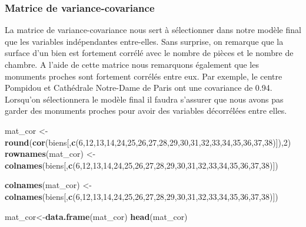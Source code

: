 \documentclass[french,]{article}
\newenvironment{Shaded}{\begin{snugshade}}{\end{snugshade}}
\newcommand{\DecValTok}[1]{\textcolor[rgb]{0.00,0.00,0.81}{#1}}
\newcommand{\KeywordTok}[1]{\textcolor[rgb]{0.13,0.29,0.53}{\textbf{#1}}}
\newcommand{\NormalTok}[1]{#1}
\newcommand{\StringTok}[1]{\textcolor[rgb]{0.31,0.60,0.02}{#1}}
\begin{document}
\hypertarget{matrice-de-variance-covariance}{%
\subsubsection{Matrice de
variance-covariance}\label{matrice-de-variance-covariance}}

La matrice de variance-covariance nous sert à sélectionner dans notre
modèle final que les variables indépendantes entre-elles. Sans surprise,
on remarque que la surface d'un bien est fortement corrélé avec le
nombre de pièces et le nombre de chambre. A l'aide de cette matrice nous
remarquons également que les monuments proches sont fortement corrélés
entre eux. Par exemple, le centre Pompidou et Cathédrale Notre-Dame de
Paris ont une covariance de 0.94. Lorsqu'on sélectionnera le modèle
final il faudra s'assurer que nous avons pas garder des monuments
proches pour avoir des variables décorrélées entre elles.

\begin{Shaded}
\begin{Highlighting}[]
\NormalTok{mat_cor <-}\StringTok{ }\KeywordTok{round}\NormalTok{(}\KeywordTok{cor}\NormalTok{(biens[,}\KeywordTok{c}\NormalTok{(}\DecValTok{6}\NormalTok{,}\DecValTok{12}\NormalTok{,}\DecValTok{13}\NormalTok{,}\DecValTok{14}\NormalTok{,}\DecValTok{24}\NormalTok{,}\DecValTok{25}\NormalTok{,}\DecValTok{26}\NormalTok{,}\DecValTok{27}\NormalTok{,}\DecValTok{28}\NormalTok{,}\DecValTok{29}\NormalTok{,}\DecValTok{30}\NormalTok{,}\DecValTok{31}\NormalTok{,}\DecValTok{32}\NormalTok{,}\DecValTok{33}\NormalTok{,}\DecValTok{34}\NormalTok{,}\DecValTok{35}\NormalTok{,}\DecValTok{36}\NormalTok{,}\DecValTok{37}\NormalTok{,}\DecValTok{38}\NormalTok{)]),}\DecValTok{2}\NormalTok{)}
\KeywordTok{rownames}\NormalTok{(mat_cor) <-}\StringTok{ }\KeywordTok{colnames}\NormalTok{(biens[,}\KeywordTok{c}\NormalTok{(}\DecValTok{6}\NormalTok{,}\DecValTok{12}\NormalTok{,}\DecValTok{13}\NormalTok{,}\DecValTok{14}\NormalTok{,}\DecValTok{24}\NormalTok{,}\DecValTok{25}\NormalTok{,}\DecValTok{26}\NormalTok{,}\DecValTok{27}\NormalTok{,}\DecValTok{28}\NormalTok{,}\DecValTok{29}\NormalTok{,}\DecValTok{30}\NormalTok{,}\DecValTok{31}\NormalTok{,}\DecValTok{32}\NormalTok{,}\DecValTok{33}\NormalTok{,}\DecValTok{34}\NormalTok{,}\DecValTok{35}\NormalTok{,}\DecValTok{36}\NormalTok{,}\DecValTok{37}\NormalTok{,}\DecValTok{38}\NormalTok{)])}

\KeywordTok{colnames}\NormalTok{(mat_cor) <-}\KeywordTok{colnames}\NormalTok{(biens[,}\KeywordTok{c}\NormalTok{(}\DecValTok{6}\NormalTok{,}\DecValTok{12}\NormalTok{,}\DecValTok{13}\NormalTok{,}\DecValTok{14}\NormalTok{,}\DecValTok{24}\NormalTok{,}\DecValTok{25}\NormalTok{,}\DecValTok{26}\NormalTok{,}\DecValTok{27}\NormalTok{,}\DecValTok{28}\NormalTok{,}\DecValTok{29}\NormalTok{,}\DecValTok{30}\NormalTok{,}\DecValTok{31}\NormalTok{,}\DecValTok{32}\NormalTok{,}\DecValTok{33}\NormalTok{,}\DecValTok{34}\NormalTok{,}\DecValTok{35}\NormalTok{,}\DecValTok{36}\NormalTok{,}\DecValTok{37}\NormalTok{,}\DecValTok{38}\NormalTok{)])}

\NormalTok{mat_cor<-}\KeywordTok{data.frame}\NormalTok{(mat_cor)}
\KeywordTok{head}\NormalTok{(mat_cor)}
\end{Highlighting}
\end{Shaded}
\end{document}

